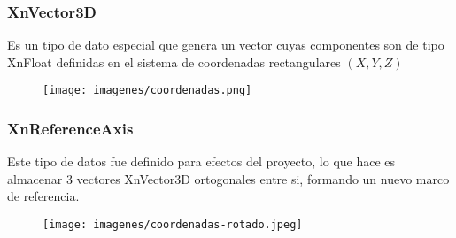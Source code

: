 \documentclass{beamer}
\begin{document}
	\begin{frame}
		\frametitle{XnVector3D}
		Es un tipo de dato  especial que genera un vector cuyas componentes son de tipo XnFloat definidas en el sistema de coordenadas rectangulares $(X,Y,Z)$

		\begin{figure}
			\texttt{[image: imagenes/coordenadas.png]}
		\end{figure}

	\end{frame}
	\begin{frame}
		\frametitle{XnReferenceAxis}
		Este tipo de datos fue definido para efectos del proyecto, lo que hace es almacenar 3 vectores XnVector3D ortogonales entre si, formando un nuevo marco de referencia.

		\begin{figure}
			\texttt{[image: imagenes/coordenadas-rotado.jpeg]}
		\end{figure}

	\end{frame}



\end{document}
